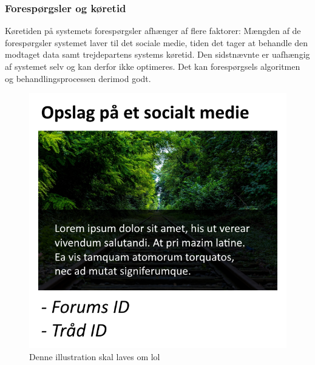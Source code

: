 \subsubsection{Forespørgsler og køretid}
Køretiden på systemets forespørgsler afhænger af flere faktorer: Mængden af de forespørgsler systemet laver til det sociale medie, tiden det tager at behandle den modtaget data samt trejdepartens systems køretid. Den sidstnævnte er uafhængig af systemet selv og kan derfor ikke optimeres. Det kan forespørgsels algoritmen og behandlingsprocessen derimod godt. 

\begin{figure}[H]
    \centering
    \includegraphics[width=0.5\linewidth]{Projectdoc/Assets/Illustrationer/requests.png}
    \caption{Denne illustration skal laves om lol}
    \label{fig:køretid}
\end{figure}

